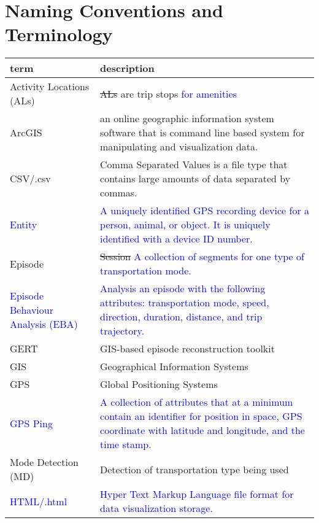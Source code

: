 \documentclass[12pt, titlepage]{article}
\begin{document}
\section{Naming Conventions and Terminology}
\begin{tabular}{l p{6cm}} 
  \toprule		
  \textbf{term} & \textbf{description}\\
  \midrule 
  Activity Locations (ALs) & \sout{ALs} are trip stops \textcolor{blue}{for amenities} \\
  ArcGIS & an online geographic information system software that is command line based system for manipulating and visualization data.\\
  CSV/.csv & Comma Separated Values is a file type that contains large amounts of data separated by commas. \\
  \textcolor{blue}{Entity} & \textcolor{blue}{A uniquely identified GPS recording device for a person, animal, or object. It is uniquely identified with a device ID number.}\\
  Episode & \sout{Session} \textcolor{blue}{A collection of segments for one type of transportation mode.}\\
  \textcolor{blue}{Episode Behaviour Analysis (EBA)} & \textcolor{blue}{Analysis an episode with the following attributes: transportation mode, speed, direction, duration, distance, and trip trajectory.} \\
  GERT & GIS-based episode reconstruction toolkit \\
  GIS & Geographical Information Systems\\
  GPS & Global Positioning Systems\\
  \textcolor{blue}{GPS Ping} & \textcolor{blue}{A collection of attributes that at a minimum contain an identifier for position in space, GPS coordinate with latitude and longitude, and the time stamp.}\\ 
  Mode Detection (MD) & Detection of transportation type being used \\
  \textcolor{blue}{HTML/.html} & \textcolor{blue}{Hyper Text Markup Language file format for data visualization storage.}\\ 
  \end{tabular}\\
\end{document}
